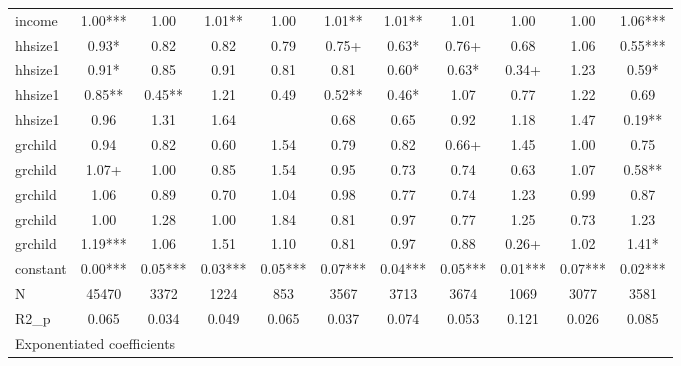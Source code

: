 {\begin{tabular}{l*{10}{c}}
income      &        1.00***&        1.00   &        1.01** &        1.00   &        1.01** &        1.01** &        1.01   &        1.00   &        1.00   &        1.06***\\
hhsize1   &        0.93*  &        0.82   &        0.82   &        0.79   &        0.75+  &        0.63*  &        0.76+  &        0.68   &        1.06   &        0.55***\\
hhsize1   &        0.91*  &        0.85   &        0.91   &        0.81   &        0.81   &        0.60*  &        0.63*  &        0.34+  &        1.23   &        0.59*  \\
hhsize1   &        0.85** &        0.45** &        1.21   &        0.49   &        0.52** &        0.46*  &        1.07   &        0.77   &        1.22   &        0.69   \\
hhsize1   &        0.96   &        1.31   &        1.64   &               &        0.68   &        0.65   &        0.92   &        1.18   &        1.47   &        0.19** \\
grchild   &        0.94   &        0.82   &        0.60   &        1.54   &        0.79   &        0.82   &        0.66+  &        1.45   &        1.00   &        0.75   \\
grchild   &        1.07+  &        1.00   &        0.85   &        1.54   &        0.95   &        0.73   &        0.74   &        0.63   &        1.07   &        0.58** \\
grchild   &        1.06   &        0.89   &        0.70   &        1.04   &        0.98   &        0.77   &        0.74   &        1.23   &        0.99   &        0.87   \\
grchild   &        1.00   &        1.28   &        1.00   &        1.84   &        0.81   &        0.97   &        0.77   &        1.25   &        0.73   &        1.23   \\
grchild   &        1.19***&        1.06   &        1.51   &        1.10   &        0.81   &        0.97   &        0.88   &        0.26+  &        1.02   &        1.41*  \\
constant    &        0.00***&        0.05***&        0.03***&        0.05***&        0.07***&        0.04***&        0.05***&        0.01***&        0.07***&        0.02***\\
\hline
N           &       45470   &        3372   &        1224   &         853   &        3567   &        3713   &        3674   &        1069   &        3077   &        3581   \\
R2\_p        &       0.065   &       0.034   &       0.049   &       0.065   &       0.037   &       0.074   &       0.053   &       0.121   &       0.026   &       0.085   \\
\hline\hline
\multicolumn{11}{l}{\footnotesize Exponentiated coefficients}\\
\end{tabular}
}
